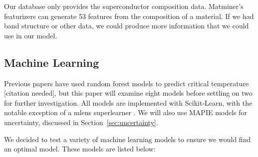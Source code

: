 \documentclass[twocolumn, nofootinbib, secnumarabic, amssymb, nobibnotes, aps, prd]{revtex4-2}
\begin{document}
Our database only provides the superconductor composition data. Matminer's featurizers can generate 53 features from the composition of a material. If we had band structure or other data, we could produce more information that we could use in our model.

\subsection{Machine Learning}

Previous papers have used random forest models to predict critical temperature [citation needed], but this paper will examine eight models before settling on two for further investigation. All models are implemented with Scikit-Learn, with the notable exception of a mlens superlearner \cite{scikit-learn, flennerhag:2017mlens}. We will also use MAPIE models for uncertainty, discussed in Section~\ref{sec:uncertainty}.

We decided to test a variety of machine learning models to ensure we would find an optimal model. These models are listed below:
\end{document}
